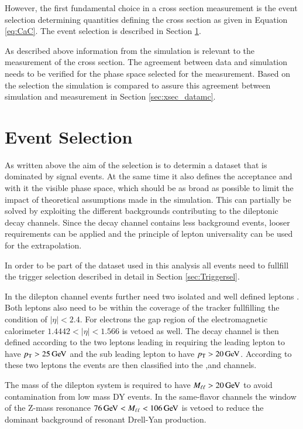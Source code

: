 However, the first fundamental choice in a cross section measurement is the event selection determining quantities defining the \ttbar cross section as given in Equation \ref{eq:CaC}.
The event selection is described in Section \ref{sec:xsec_sel}.


As described above information from the simulation is relevant to the measurement of the \ttbar cross section.
The agreement between data and simulation needs to be verified for the phase space selected for the measurement.
Based on the selection the simulation is compared to assure this agreement between simulation and measurement in Section \ref{sec:xsec_datamc}.

\section{Event Selection}
\label{sec:xsec_sel}

As written above the aim of the selection is to determin a dataset that is dominated by signal events. At the same time it also defines the acceptance and with it the visible phase space, which should be as broad as possible to limit the impact of theoretical assumptions made in the simulation.
This can partially be solved by exploiting the different backgrounds contributing to the dileptonic \ttbar decay channels. 
Since the \emu decay channel contains less background events, looser requirements can be applied and the principle of lepton universality can be used for the extrapolation.

In order to be part of the dataset used in this analysis all events need to fullfill the trigger selection described in detail in Section \ref{sec:Triggersel}.

In the dilepton channel events further need two isolated and well defined leptons .
Both leptons also need to be within the coverage of the tracker fullfilling the condition of $|\eta| < 2.4$.
For electrons the gap region of the electromagnetic calorimeter $1.4442<|\eta|<1.566$ is vetoed as well.
The decay channel is then defined according to the two leptons leading in \pt requiring the leading lepton to have $p_{\mathrm{T}} > 25 \,\text{Ge\hspace{-.08em}V}$
and the sub leading lepton to have $p_{\mathrm{T}} > 20 \,\text{Ge\hspace{-.08em}V}$. 
According to these two leptons the events are then classified into the \emu,\ee and \mumu channels.

The mass of the dilepton system is required to have $M_{\ell\ell} > 20 \,\text{Ge\hspace{-.08em}V}$ to avoid contamination from low mass DY events.
In the same-flavor channels the window of the Z-mass resonance $76 \,\text{Ge\hspace{-.08em}V} < M_{\ell\ell} <106 \,\text{Ge\hspace{-.08em}V}$ is vetoed to reduce the dominant background of 
resonant Drell-Yan production.

